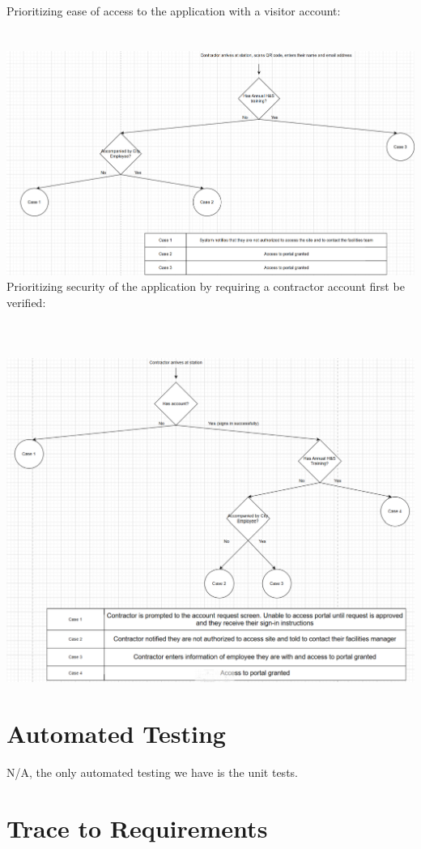 \documentclass[12pt, titlepage]{article}
\begin{document}
Prioritizing ease of access to the application with a visitor account:\\
\\
\\
\includegraphics[scale=0.7]{ease_of_access.png}
\newpage
Prioritizing security of the application by requiring a contractor
account first be verified:\\
\\
\\
\\
\includegraphics[scale=0.7]{trusted_access.png}
\newpage
\section{Automated Testing}
N/A, the only automated testing we have is the unit tests.

\section{Trace to Requirements}
\end{document}
